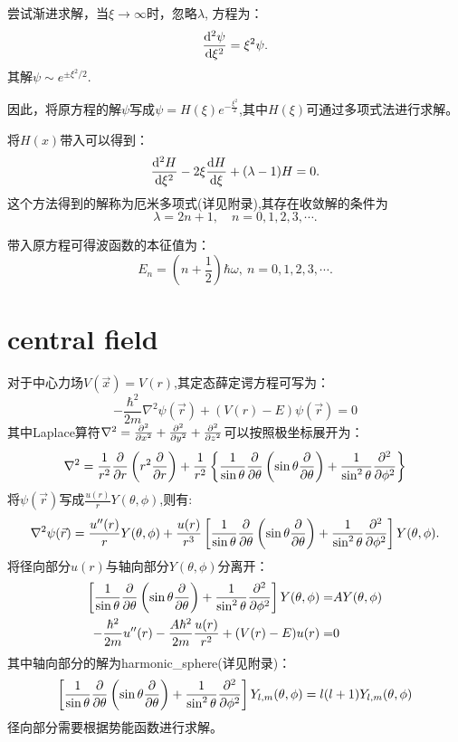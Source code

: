 尝试渐进求解，当$\xi\to\infty$时，忽略$\lambda$, 方程为：
\begin{equation}
    \frac{\mathrm{d}^2 \psi}{\mathrm{d} \xi^2}=\xi^2\psi.
\end{equation}
其解$\psi\sim e^{\pm\xi^2/2}$.

因此，将原方程的解$\psi$写成$\psi=H(\xi)e^{-\frac{\xi^2}{2}}$,其中$H(\xi)$可通过多项式法进行求解。

将$H(x)$带入可以得到：
\begin{equation}
    \frac{\mathrm{d}^2 H}{\mathrm{d} \xi^2}-2\xi\frac{\mathrm{d} H}{\mathrm{d} \xi}+(\lambda-1)H=0.
\end{equation}
这个方法得到的解称为厄米多项式(详见附录),其存在收敛解的条件为
\begin{equation}
    \lambda=2n+1, \quad n=0,1,2,3,\cdots.
\end{equation}

带入原方程可得波函数的本征值为：
\begin{equation}
    E_n=\left(n+\frac{1}{2}\right)\hbar\omega,\ n=0,1,2,3,\cdots. 
\end{equation}

\section{central field}
对于中心力场$V(\vec{x})=V(r)$,其定态薛定谔方程可写为：
\begin{equation}
    -\frac{\hbar^2}{2m}\nabla^2\psi(\vec{r})+(V(r)-E)\psi(\vec{r})=0
\end{equation}
其中Laplace算符$\nabla^2=\frac{\partial^2 }{\partial x^2}+\frac{\partial^2 }{\partial y^2}+\frac{\partial^2 }{\partial z^2}$可以按照极坐标展开为：
\begin{equation}
    \nabla^2=\frac{1}{r^2}\frac{\partial }{\partial r}\left(r^2\frac{\partial }{\partial r}\right)+\frac{1}{r^2}\left\lbrace \frac{1}{\sin\theta}\frac{\partial }{\partial \theta}\left(\sin\theta\frac{\partial }{\partial \theta}\right)+\frac{1}{\sin^2\theta}\frac{\partial^2 }{\partial \phi^2}\right\rbrace
\end{equation}
将$\psi(\vec{r})$写成$\frac{u(r)}{r}Y(\theta,\phi)$,则有:
\begin{equation}
    \nabla^2\psi(\vec{r})=\frac{u''(r)}{r}Y(\theta,\phi)+\frac{u(r)}{r^3}\left[ \frac{1}{\sin\theta}\frac{\partial }{\partial \theta}\left(\sin\theta\frac{\partial }{\partial \theta}\right)+\frac{1}{\sin^2\theta}\frac{\partial^2 }{\partial \phi^2}\right]Y(\theta,\phi).
\end{equation}
将径向部分$u(r)$与轴向部分$Y(\theta,\phi)$分离开：
\begin{align}
    \left[ \frac{1}{\sin\theta}\frac{\partial }{\partial \theta}\left(\sin\theta\frac{\partial }{\partial \theta}\right)+\frac{1}{\sin^2\theta}\frac{\partial^2 }{\partial \phi^2}\right]Y(\theta,\phi)=&AY(\theta,\phi)\\
    -\frac{\hbar^2}{2m}u''(r)-\frac{A\hbar^2}{2m}\frac{u(r)}{r^2}+(V(r)-E)u(r)=&0
\end{align}
其中轴向部分的解为\gls{harmonic_sphere}(详见附录)：
\begin{equation}
    \left[ \frac{1}{\sin\theta}\frac{\partial }{\partial \theta}\left(\sin\theta\frac{\partial }{\partial \theta}\right)+\frac{1}{\sin^2\theta}\frac{\partial^2 }{\partial \phi^2}\right]Y_{l,m}(\theta,\phi)=l(l+1)Y_{l,m}(\theta,\phi)
\end{equation}
径向部分需要根据势能函数进行求解。

